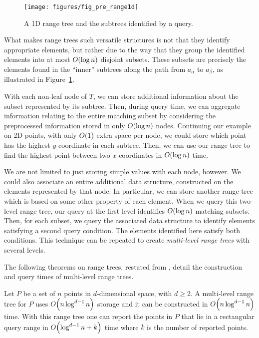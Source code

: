 \begin{figure}
\begin{center}
  \texttt{[image: figures/fig\_pre\_range1d]}
  \caption{A 1D range tree and the subtrees identified by a query.}
  \label{fig:pre:range1d}
\end{center}
\end{figure}

What makes range trees such versatile structures is not that they identify appropriate elements, but rather due to the way that they group the identified elements into at most $O\!\left(\log{n}\right)$ disjoint subsets.
These subsets are precisely the elements found in the ``inner'' subtrees along the path from $a_\alpha$ to $a_\beta$, as illustrated in Figure~\ref{fig:pre:range1d}.

With each non-leaf node of $T$, we can store additional information about the subset represented by its subtree.
Then, during query time, we can aggregate information relating to the entire matching subset by considering the preprocessed information stored in only $O\!\left(\log{n}\right)$ nodes.
Continuing our example on 2D points, with only $O\!\left(1\right)$ extra space per node, we could store which point has the highest $y$-coordinate in each subtree.
Then, we can use our range tree to find the highest point between two $x$-coordinates in $O\!\left(\log{n}\right)$ time.

We are not limited to just storing simple values with each node, however.
We could also associate an entire additional data structure, constructed on the elements represented by that node.
In particular, we can store another range tree which is based on some other property of each element.
When we query this two-level range tree, our query at the first level identifies $O\!\left(\log{n}\right)$ matching subsets.
Then, for each subset, we query the associated data structure to identify elements satisfying a second query condition.
The elements identified here satisfy both conditions.
This technique can be repeated to create \emph{multi-level range trees} with several levels.

The following theorems on range trees, restated from \cite[Chapter~5]{Deberg}, detail the construction and query times of multi-level range trees.

\begin{theorem}
\label{th:rangetree}
Let $P$ be a set of $n$ points in $d$-dimensional space, with $d \geq 2$. A multi-level range tree for $P$ uses $O\!\left(n \log^{d-1}{n}\right)$ storage and it can be constructed in $O\!\left(n \log^{d-1}{n}\right)$ time. With this range tree one can report the points in $P$ that lie in a rectangular query range in $O\!\left(\log^{d-1}{n} + k\right)$ time where $k$ is the number of reported points.
\end{theorem}

